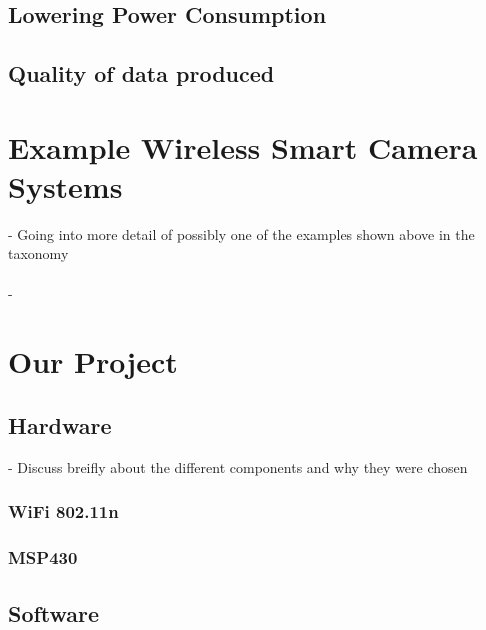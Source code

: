 \documentclass[journal,transmag]{IEEEtran}
\begin{document}
\subsection{Lowering Power Consumption}

\subsection{Quality of data produced}

\section{Example Wireless Smart Camera Systems}
\-- Going into more detail of possibly one of the examples shown above in
	the taxonomy\\ \\
\--

\section{Our Project}

\subsection{Hardware}
 \-- Discuss breifly about the different components and why they were chosen \\

\subsubsection{WiFi 802.11n \\}
\subsubsection{MSP430 \\}

\subsection{Software}
\end{document}

